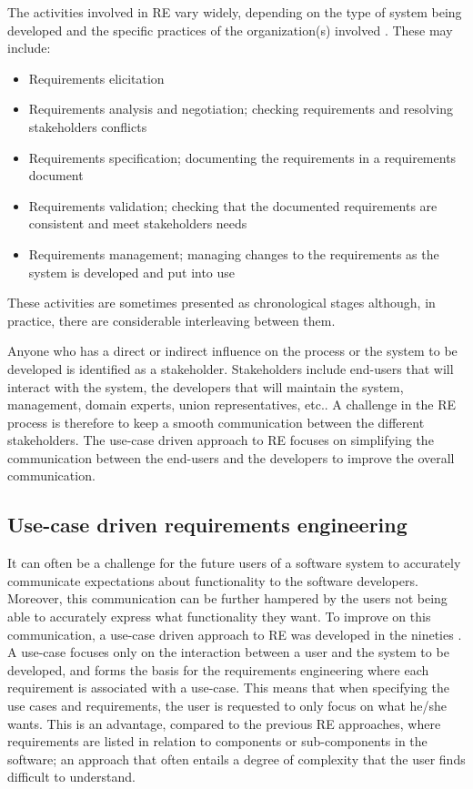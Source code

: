 The activities involved in RE vary widely, depending on the type of system being developed and the specific practices of the organization(s) involved  \cite{Som11}.  These may include:
\begin{itemize}
\item Requirements elicitation 
\item Requirements analysis and negotiation; checking requirements and resolving stakeholders conflicts
\item Requirements specification; documenting the requirements in a requirements document
\item Requirements validation; checking that the documented requirements are consistent and meet stakeholders needs
\item Requirements management; managing changes to the requirements as the system is developed and put into use
\end{itemize}

These activities are sometimes presented as chronological stages although, in practice, there  are considerable interleaving between them.  

Anyone who has a direct or indirect influence on the process or the system to be developed is identified as a stakeholder.   Stakeholders include end-users that will interact with the system, the developers that will maintain the system, management, domain experts, union representatives, etc..  A challenge in the RE process is therefore to keep a smooth communication between the different stakeholders.  The use-case driven approach to RE focuses on simplifying the communication between the end-users and the developers to improve the overall communication.

\subsection{Use-case driven requirements engineering}
\label{sec:use-case-driven}
It can often be a challenge for the future users of a software system to accurately communicate expectations about functionality to the
software developers. Moreover, this communication can be further hampered by the users not
being able to accurately express what functionality they want. To improve on this communication, a use-case driven
approach to RE was developed in the
nineties  \cite{Jac92,Poh10,Coc01}.  A use-case focuses only on the interaction between a user and the system to be
developed, and forms the basis for the requirements engineering where each requirement is
associated with a use-case. This means that when specifying the use cases and requirements, the user is requested to only focus on what he/she wants.  This is an
advantage, compared to the previous RE approaches, where requirements are listed in relation to
components or sub-components in
the software; an approach that often entails a degree of complexity that the user finds difficult to understand. 

